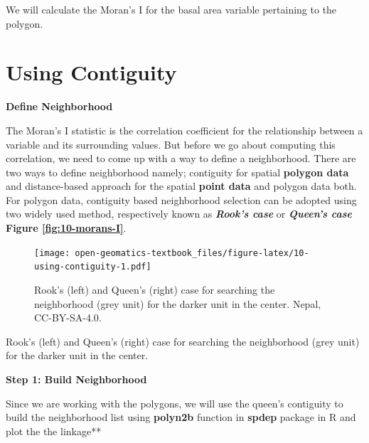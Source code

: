 \documentclass[
]{book}
\begin{document}
We will calculate the Moran's I for the basal area variable pertaining to the polygon.

\hypertarget{using-contiguity}{%
\section*{Using Contiguity}\label{using-contiguity}}

\textbf{Define Neighborhood}

The Moran's I statistic is the correlation coefficient for the relationship between a variable and its surrounding values. But before we go about computing this correlation, we need to come up with a way to define a neighborhood. There are two ways to define neighborhood namely; contiguity for spatial \textbf{polygon data} and distance-based approach for the spatial \textbf{point data} and polygon data both. For polygon data, contiguity based neighborhood selection can be adopted using two widely used method, respectively known as \textbf{\emph{Rook's case}} or \textbf{\emph{Queen's case}} \textbf{Figure \ref{fig:10-morans-I}}.

\begin{figure}
\centering
\texttt{[image: open-geomatics-textbook\_files/figure-latex/10-using-contiguity-1.pdf]}
\caption{\label{fig:10-using-contiguity}Rook's (left) and Queen's (right) case for searching the neighborhood (grey unit) for the darker unit in the center. Nepal, CC-BY-SA-4.0.}
\end{figure}

Rook's (left) and Queen's (right) case for searching the neighborhood (grey unit) for the darker unit in the center.

\textbf{Step 1: Build Neighborhood}

Since we are working with the polygons, we will use the queen's contiguity to build the neighborhood list using \textbf{polyn2b} function in \textbf{spdep} package in R and plot the the linkage**
\end{document}
